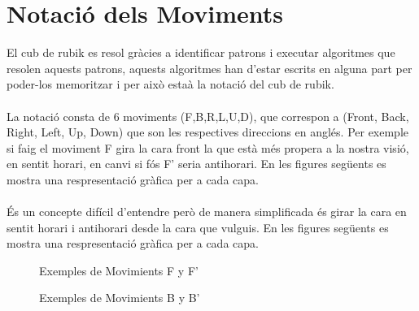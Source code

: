 \section{Notació dels Moviments}

El cub de rubik es resol gràcies a identificar patrons i executar algoritmes que resolen aquests patrons, aquests algoritmes han d'estar escrits en alguna part per poder-los memoritzar i per això estaà la notació del cub de rubik.
\\\\La notació consta de 6 moviments (F,B,R,L,U,D), que correspon a (Front, Back, Right, Left, Up, Down) que son les respectives direccions en anglés. Per exemple si faig el moviment F gira la cara front la que està més propera a la nostra visió, en sentit horari, en canvi si fós F' seria antihorari. En les figures següents es mostra una respresentació gràfica per a cada capa.
\\\\És un concepte difícil d'entendre però de manera simplificada és girar la cara en sentit horari i antihorari desde la cara que vulguis. En les figures següents es mostra una respresentació gràfica per a cada capa.

\begin{figure}[htbp]
    \centering
    \begin{subfigure}
        \centering\RubikCubeSolvedWY
    \end{subfigure}
    \begin{subfigure}
        \centering\RubikCubeSolvedWY
    \end{subfigure}
    \caption{Exemples de Movimients F y F'}
\end{figure}

\begin{figure}[htbp]
    \centering
    \begin{subfigure}
        \centering\RubikCubeSolvedWY
    \end{subfigure}
    \begin{subfigure}
        \centering\RubikCubeSolvedWY
    \end{subfigure}
    \caption{Exemples de Movimients B y B'}
\end{figure}

